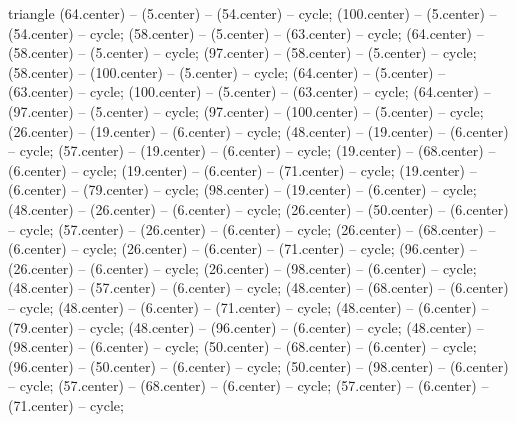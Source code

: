 \begin{pgfonlayer}{triangle}
 (64.center) -- (5.center) -- (54.center) -- cycle; 
 (100.center) -- (5.center) -- (54.center) -- cycle; 
 (58.center) -- (5.center) -- (63.center) -- cycle; 
 (64.center) -- (58.center) -- (5.center) -- cycle; 
 (97.center) -- (58.center) -- (5.center) -- cycle; 
 (58.center) -- (100.center) -- (5.center) -- cycle; 
 (64.center) -- (5.center) -- (63.center) -- cycle; 
 (100.center) -- (5.center) -- (63.center) -- cycle; 
 (64.center) -- (97.center) -- (5.center) -- cycle; 
 (97.center) -- (100.center) -- (5.center) -- cycle; 
 (26.center) -- (19.center) -- (6.center) -- cycle; 
 (48.center) -- (19.center) -- (6.center) -- cycle; 
 (57.center) -- (19.center) -- (6.center) -- cycle; 
 (19.center) -- (68.center) -- (6.center) -- cycle; 
 (19.center) -- (6.center) -- (71.center) -- cycle; 
 (19.center) -- (6.center) -- (79.center) -- cycle; 
 (98.center) -- (19.center) -- (6.center) -- cycle; 
 (48.center) -- (26.center) -- (6.center) -- cycle; 
 (26.center) -- (50.center) -- (6.center) -- cycle; 
 (57.center) -- (26.center) -- (6.center) -- cycle; 
 (26.center) -- (68.center) -- (6.center) -- cycle; 
 (26.center) -- (6.center) -- (71.center) -- cycle; 
 (96.center) -- (26.center) -- (6.center) -- cycle; 
 (26.center) -- (98.center) -- (6.center) -- cycle; 
 (48.center) -- (57.center) -- (6.center) -- cycle; 
 (48.center) -- (68.center) -- (6.center) -- cycle; 
 (48.center) -- (6.center) -- (71.center) -- cycle; 
 (48.center) -- (6.center) -- (79.center) -- cycle; 
 (48.center) -- (96.center) -- (6.center) -- cycle; 
 (48.center) -- (98.center) -- (6.center) -- cycle; 
 (50.center) -- (68.center) -- (6.center) -- cycle; 
 (96.center) -- (50.center) -- (6.center) -- cycle; 
 (50.center) -- (98.center) -- (6.center) -- cycle; 
 (57.center) -- (68.center) -- (6.center) -- cycle; 
 (57.center) -- (6.center) -- (71.center) -- cycle; 

\end{pgfonlayer}
